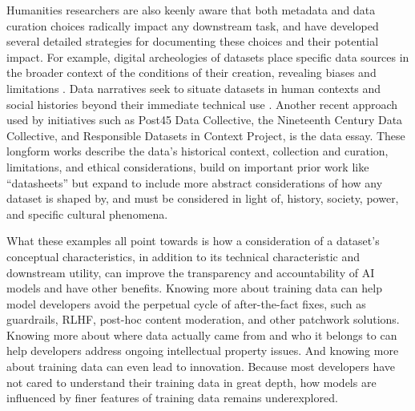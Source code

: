 Humanities researchers are also keenly aware that both metadata and data curation choices radically impact any downstream task, and have developed several detailed strategies for documenting these choices and their potential impact. For example, digital archeologies of datasets place specific data sources in the broader context of the conditions of their creation, revealing biases and limitations \cite{lee_compounded_2021,fyfe_archaeology_2016}. Data narratives seek to situate datasets in human contexts and social histories beyond their immediate technical use \cite{pouchard_data_2014}. Another recent approach used by initiatives such as Post45 Data Collective, the Nineteenth Century Data Collective, and Responsible Datasets in Context Project, is the data essay. These longform works describe the data’s historical context, collection and curation, limitations, and ethical considerations, build on important prior work like ``datasheets''  but expand to include more abstract considerations of how any dataset is shaped by, and must be considered in light of, history, society, power, and specific cultural phenomena.

What these examples all point towards is how a consideration of a dataset’s conceptual characteristics, in addition to its technical characteristic and downstream utility, can improve the transparency and accountability of AI models and have other benefits.  Knowing more about training data can help model developers avoid the perpetual cycle of after-the-fact fixes, such as guardrails, RLHF, post-hoc content moderation, and other patchwork solutions. Knowing more about where data actually came from and who it belongs to can help developers address ongoing intellectual property issues. And knowing more about training data can even lead to innovation. Because most developers have not cared to understand their training data in great depth, how models are influenced by finer features of training data remains underexplored.
